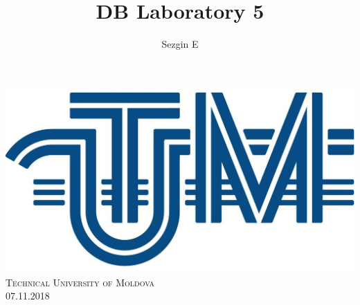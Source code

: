 \documentclass[12pt]{article}
\title{DB Laboratory 5}
\author{Sezgin E}
\begin{document}
        
        
        \begin{titlepage}
                \centering
                \vspace*{0.5 cm}
                \includegraphics[scale = 0.11]{LOGO_UTM.jpg}\\[1.0 cm]	%
                \textsc{\LARGE Technical University of Moldova}\\[2.0 cm]%
                \textsc{\Large 07.11.2018}\\[0.5 cm]		%


\end{titlepage}
\end{document}

